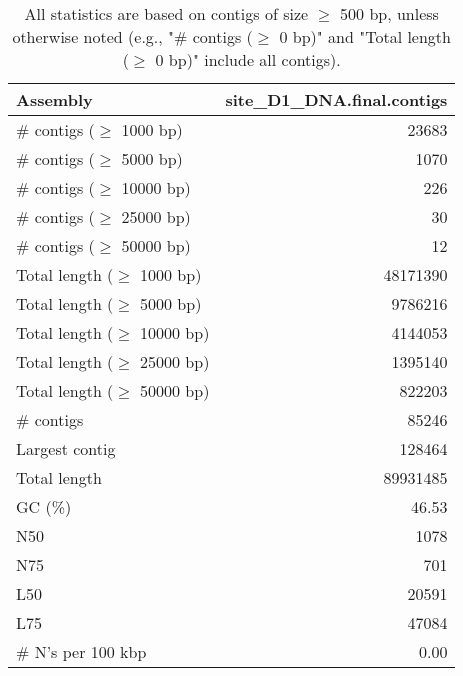 \documentclass[12pt,a4paper]{article}
\begin{document}
\begin{table}[ht]
\begin{center}
\caption{All statistics are based on contigs of size $\geq$ 500 bp, unless otherwise noted (e.g., "\# contigs ($\geq$ 0 bp)" and "Total length ($\geq$ 0 bp)" include all contigs).}
\begin{tabular}{|l*{1}{|r}|}
\hline
Assembly & site\_D1\_DNA.final.contigs \\ \hline
\# contigs ($\geq$ 1000 bp) & 23683 \\ \hline
\# contigs ($\geq$ 5000 bp) & 1070 \\ \hline
\# contigs ($\geq$ 10000 bp) & 226 \\ \hline
\# contigs ($\geq$ 25000 bp) & 30 \\ \hline
\# contigs ($\geq$ 50000 bp) & 12 \\ \hline
Total length ($\geq$ 1000 bp) & 48171390 \\ \hline
Total length ($\geq$ 5000 bp) & 9786216 \\ \hline
Total length ($\geq$ 10000 bp) & 4144053 \\ \hline
Total length ($\geq$ 25000 bp) & 1395140 \\ \hline
Total length ($\geq$ 50000 bp) & 822203 \\ \hline
\# contigs & 85246 \\ \hline
Largest contig & 128464 \\ \hline
Total length & 89931485 \\ \hline
GC (\%) & 46.53 \\ \hline
N50 & 1078 \\ \hline
N75 & 701 \\ \hline
L50 & 20591 \\ \hline
L75 & 47084 \\ \hline
\# N's per 100 kbp & 0.00 \\ \hline
\end{tabular}
\end{center}
\end{table}
\end{document}
